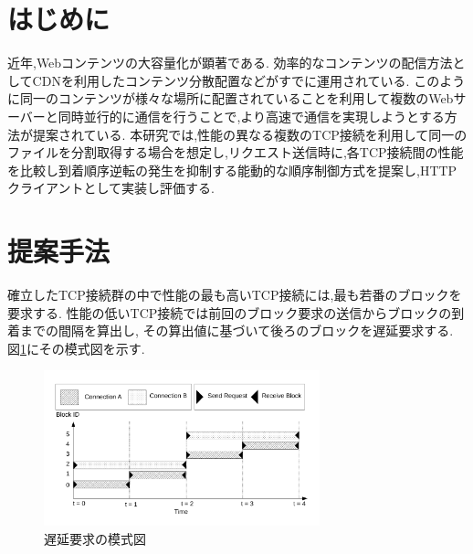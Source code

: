\documentclass{ltjsarticle}
\begin{document}
 
\section{はじめに}
近年,Webコンテンツの大容量化が顕著である.
効率的なコンテンツの配信方法としてCDNを利用したコンテンツ分散配置などがすでに運用されている.
このように同一のコンテンツが様々な場所に配置されていることを利用して複数のWebサーバーと同時並行的に通信を行うことで,より高速で通信を実現しようとする方法が提案されている.
本研究では,性能の異なる複数のTCP接続を利用して同一のファイルを分割取得する場合を想定し,リクエスト送信時に,各TCP接続間の性能を比較し到着順序逆転の発生を抑制する能動的な順序制御方式を提案し,HTTPクライアントとして実装し評価する.

\section{提案手法}
確立したTCP接続群の中で性能の最も高いTCP接続には,最も若番のブロックを要求する.
性能の低いTCP接続では前回のブロック要求の送信からブロックの到着までの間隔を算出し,
その算出値に基づいて後ろのブロックを遅延要求する.
図\ref{delay}にその模式図を示す.

\begin{figure}[ht]
	\centering
	\includegraphics[width=8cm]{figure/delay.pdf}
	\caption{遅延要求の模式図}
	\label{delay}
\end{figure}
\end{document}
